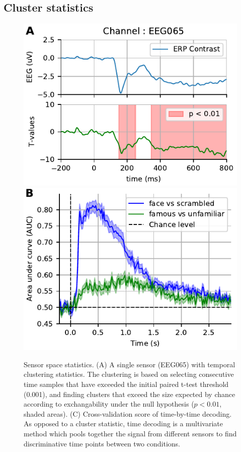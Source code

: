 \subsection{Cluster statistics}

\begin{figure}
\centering
    \includegraphics[width=0.49\linewidth]{figures/sensorstat_highpass-NoneHz.pdf}
    \includegraphics[width=0.49\linewidth]{figures/time_decoding_highpass-NoneHz.pdf}
    \caption[Sensor space statistics.]{Sensor space statistics. (A) A single sensor (EEG065) with temporal clustering statistics. The clustering is based on selecting consecutive time samples that have exceeded the initial paired t-test threshold (0.001), and finding clusters that exceed the size expected by chance according to exchangability under the null hypothesis ($p < 0.01$, shaded areas). (C) Cross-validation score of time-by-time decoding. As opposed to a cluster statistic, time decoding is a multivariate method which pools together the signal from different sensors to find discriminative time points between two conditions.}
\label{fig:fig_sensorstat}
\end{figure}

